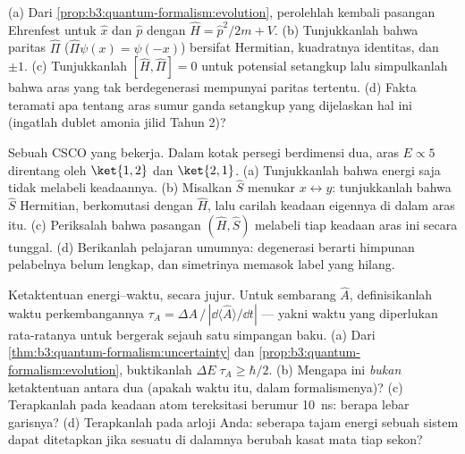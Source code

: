 \begin{exercise}[$\star\star$]\label{exo:b3:quantum-formalism:8}
(a) Dari \cref{prop:b3:quantum-formalism:evolution}, perolehlah kembali
pasangan Ehrenfest untuk $\hat x$ dan $\hat p$ dengan $\hat H = \hat
p^2/2m + V$. (b) Tunjukkanlah bahwa paritas $\hat\Pi$ ($\hat\Pi\psi(x) =
\psi(-x)$) bersifat Hermitian, kuadratnya identitas, dan 
$\pm1$. (c) Tunjukkanlah $[\hat H, \hat\Pi] = 0$ untuk potensial
setangkup lalu simpulkanlah bahwa aras yang tak berdegenerasi mempunyai
paritas tertentu. (d) Fakta teramati apa tentang aras sumur ganda
setangkup yang dijelaskan hal ini (ingatlah dublet amonia jilid Tahun 2)?
\end{exercise}

\begin{exercise}[$\star\star$]\label{exo:b3:quantum-formalism:9}
Sebuah CSCO yang bekerja. Dalam kotak persegi berdimensi dua, aras $E
\propto 5$ direntang oleh $\ket{1,2}$ dan $\ket{2,1}$. (a) Tunjukkanlah
bahwa energi saja tidak melabeli keadaannya. (b) Misalkan $\hat S$
menukar $x
\leftrightarrow y$: tunjukkanlah bahwa $\hat S$ Hermitian, berkomutasi dengan $\hat
H$, lalu carilah keadaan eigennya di dalam aras itu. (c)
Periksalah bahwa pasangan $(\hat H, \hat S)$ melabeli tiap keadaan aras
ini secara tunggal. (d) Berikanlah pelajaran umumnya: degenerasi berarti
himpunan pelabelnya belum lengkap, dan simetrinya memasok label yang
hilang.
\end{exercise}

\begin{exercise}[$\star\star\star$]\label{exo:b3:quantum-formalism:10}
Ketaktentuan energi--waktu, secara jujur. Untuk sembarang  $\hat A$, definisikanlah waktu perkembangannya $\tau_A = \Delta A\,/\,|\dd\langle\hat
A\rangle/\dd t|$ --- yakni waktu yang diperlukan rata-ratanya untuk
bergerak sejauh satu simpangan baku. (a) Dari
\cref{thm:b3:quantum-formalism:uncertainty} dan
\cref{prop:b3:quantum-formalism:evolution}, buktikanlah $\Delta
E\;\tau_A \ge \hbar/2$. (b) Mengapa ini \emph{bukan} ketaktentuan antara
dua  (apakah waktu itu, dalam formalismenya)? (c)
Terapkanlah pada keadaan atom tereksitasi berumur \qty{10}{ns}: berapa
lebar garisnya? (d) Terapkanlah pada arloji Anda: seberapa tajam energi
sebuah sistem dapat ditetapkan jika sesuatu di dalamnya berubah kasat
mata tiap sekon?
\end{exercise}

